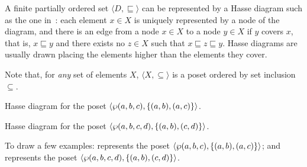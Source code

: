 A finite partially ordered set $\langle D, \sqsubseteq \rangle$ can be represented by a Hasse diagram such as the one in~: each element $x \in X$ is uniquely represented by a node of the diagram, and there is an edge from a node $x \in X$ to a node $y \in X$ if $y$ covers $x$, that is, $x \sqsubseteq y$ and there exists no $z \in X$ such that $x \sqsubseteq z \sqsubseteq y$. Hasse diagrams are usually drawn placing the elements higher than the elements they cover.

\begin{remark}
  Note that, for \emph{any} set of elements $X$, $\langle X, \subseteq \rangle$ is a poset ordered by set inclusion $\subseteq$.
\end{remark}

\begin{marginfigure}
  \centering
  \caption{Hasse diagram for the poset $\langle \wp(a, b, c), \{(a, b), (a, c)\}\rangle$.}
  \end{marginfigure}

\begin{marginfigure}
  \centering
  \caption{Hasse diagram for the poset $\langle \wp(a, b, c, d), \{(a, b), (c, d)\}\rangle$.}
  \end{marginfigure}

\begin{example}
  To draw a few examples:  represents the poset $\langle \wp(a, b, c), \{(a, b), (a, c)\}\rangle$; and  represents the poset $\langle \wp(a, b, c, d), \{(a, b), (c, d)\}\rangle$.
\end{example}


